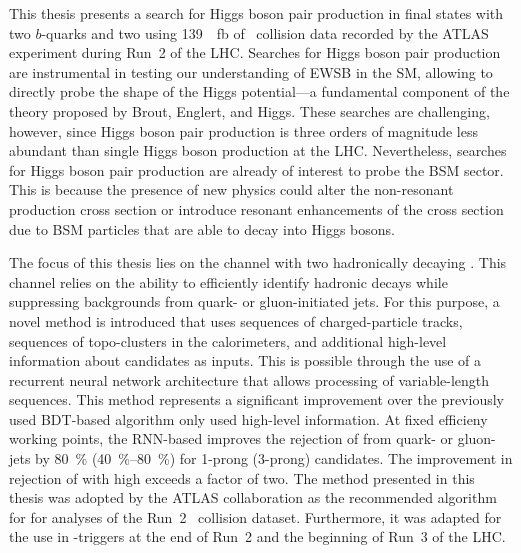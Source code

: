 This thesis presents a search for Higgs boson pair production in final states
with two $b$-quarks and two \tauleptons using \SI{139}{\per\femto\barn} of
\pp~collision data recorded by the ATLAS experiment during Run~2 of the
LHC. Searches for Higgs boson pair production are instrumental in testing our
understanding of EWSB in the SM, allowing to directly probe the shape of the
Higgs potential---a fundamental component of the theory proposed by Brout,
Englert, and Higgs. These searches are challenging, however, since Higgs boson
pair production is three orders of magnitude less abundant than single Higgs
boson production at the LHC. Nevertheless, searches for Higgs boson pair
production are already of interest to probe the BSM sector. This is because the
presence of new physics could alter the non-resonant \HH production cross
section or introduce resonant enhancements of the cross section due to BSM
particles that are able to decay into Higgs bosons.


The focus of this thesis lies on the channel with two hadronically decaying
\tauleptons. This channel relies on the ability to efficiently identify hadronic
\taulepton decays while suppressing backgrounds from quark- or gluon-initiated
jets. For this purpose, a novel \tauid method is introduced that uses sequences
of charged-particle tracks, sequences of topo-clusters in the calorimeters, and
additional high-level information about \tauhadvis candidates as inputs. This is
possible through the use of a recurrent neural network architecture that allows
processing of variable-length sequences. This method represents a significant
improvement over the previously used BDT-based algorithm only used high-level
information. At fixed \tauhadvis efficieny working points, the RNN-based \tauid
improves the rejection of \faketauhadvis from quark- or gluon-jets by
\SI{80}{\percent} (\SIrange{40}{80}{\percent}) for 1-prong (3-prong) \tauhadvis
candidates. The improvement in rejection of \faketauhadvis with high \pT exceeds
a factor of two. The method presented in this thesis was adopted by the ATLAS
collaboration as the recommended algorithm for \tauid for analyses of the Run~2
\pp~collision dataset. Furthermore, it was adapted for the use in
\tauhadvis-triggers at the end of Run~2 and the beginning of Run~3 of the LHC.


